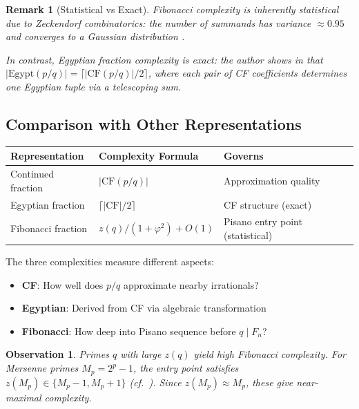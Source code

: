 \documentclass[11pt]{article}
\newtheorem{observation}[theorem]{Observation}
\newtheorem{remark}[theorem]{Remark}
\begin{document}
\begin{remark}[Statistical vs Exact]
Fibonacci complexity is inherently \emph{statistical} due to Zeckendorf combinatorics: the number of summands has variance $\approx 0.95$ and converges to a Gaussian distribution \cite{kologlu2010}.

In contrast, Egyptian fraction complexity is \emph{exact}: the author shows in \cite{egypt2025} that $|\mathrm{Egypt}(p/q)| = \lceil |\mathrm{CF}(p/q)|/2 \rceil$, where each pair of CF coefficients determines one Egyptian tuple via a telescoping sum.
\end{remark}

\subsection{Comparison with Other Representations}

\begin{center}
\begin{tabular}{@{}lll@{}}
\toprule
Representation & Complexity Formula & Governs \\
\midrule
Continued fraction & $|\mathrm{CF}(p/q)|$ & Approximation quality \\
Egyptian fraction & $\lceil |\mathrm{CF}|/2 \rceil$ & CF structure (exact) \\
Fibonacci fraction & $z(q)/(1+\varphi^2) + O(1)$ & Pisano entry point (statistical) \\
\bottomrule
\end{tabular}
\end{center}

The three complexities measure different aspects:
\begin{itemize}
    \item \textbf{CF}: How well does $p/q$ approximate nearby irrationals?
    \item \textbf{Egyptian}: Derived from CF via algebraic transformation
    \item \textbf{Fibonacci}: How deep into Pisano sequence before $q \mid F_n$?
\end{itemize}

\begin{observation}
Primes $q$ with large $z(q)$ yield high Fibonacci complexity. For Mersenne primes $M_p = 2^p - 1$, the entry point satisfies $z(M_p) \in \{M_p - 1, M_p + 1\}$ (cf.\ \cite{wall1960}). Since $z(M_p) \approx M_p$, these give near-maximal complexity.
\end{observation}
\end{document}
